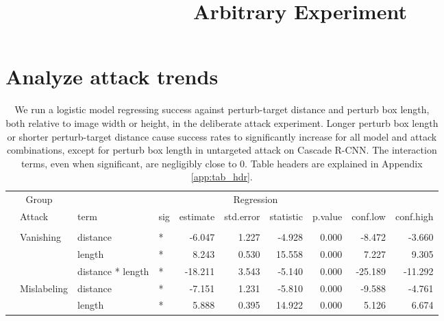\documentclass[
]{article}
\title{Arbitrary Experiment}
\author{}
\date{\vspace{-2.5em}}
\begin{document}
\maketitle

\section{Analyze attack trends}\label{analyze-attack-trends}

\begingroup\fontsize{9}{11}\selectfont

\begin{longtable}[t]{llllrrrrrr}
\caption{\label{tab:arbitrary_trend_table}We run a logistic model regressing success against perturb-target distance and perturb box length, both relative to image width or height, in the deliberate attack experiment. Longer perturb box length or shorter perturb-target distance cause success rates to significantly increase for all model and attack combinations, except for perturb box length in untargeted attack on Cascade R-CNN. The interaction terms, even when significant, are negligibly close to 0. Table headers are explained in Appendix \ref{app:tab_hdr}.}\\
\toprule
\multicolumn{2}{c}{Group} & \multicolumn{8}{c}{Regression} \\
\cmidrule(l{3pt}r{3pt}){1-2} \cmidrule(l{3pt}r{3pt}){3-10}
 & Attack & term & sig & estimate & std.error & statistic & p.value & conf.low & conf.high\\
\midrule
\addlinespace[0.3em]
\multicolumn{10}{l}{\textbf{YOLOv3}}\\
\hspace{1em} & Vanishing & distance & * & -6.047 & 1.227 & -4.928 & 0.000 & -8.472 & -3.660\\
\cmidrule{3-10}\nopagebreak
\hspace{1em} &  & length & * & 8.243 & 0.530 & 15.558 & 0.000 & 7.227 & 9.305\\
\cmidrule{3-10}\nopagebreak
\hspace{1em} &  & distance * length & * & -18.211 & 3.543 & -5.140 & 0.000 & -25.189 & -11.292\\
\cmidrule{2-10}\nopagebreak
\hspace{1em} & Mislabeling & distance & * & -7.151 & 1.231 & -5.810 & 0.000 & -9.588 & -4.761\\
\cmidrule{3-10}\nopagebreak
\hspace{1em} &  & length & * & 5.888 & 0.395 & 14.922 & 0.000 & 5.126 & 6.674\\

\end{longtable}
\end{document}
